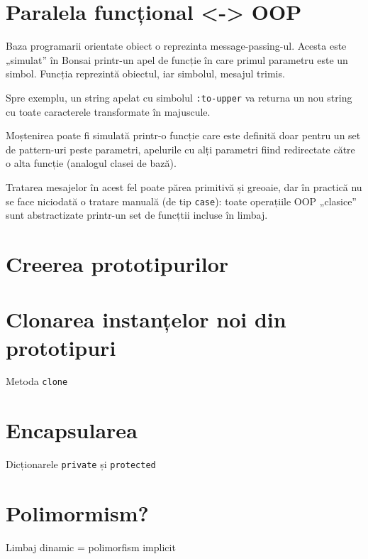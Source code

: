 \documentclass[12pt,a4paper]{memoir}
\begin{document}
\section{Paralela funcțional <-> OOP}

Baza programarii orientate obiect o reprezinta message-passing-ul. Acesta este „simulat” în Bonsai printr-un apel de funcție în care primul parametru este un simbol. Funcția reprezintă obiectul, iar simbolul, mesajul trimis. 

Spre exemplu, un string apelat cu simbolul \texttt{:to-upper} va returna un nou string cu toate caracterele transformate în majuscule. 

Moștenirea poate fi simulată printr-o funcție care este definită doar pentru un set de pattern-uri peste parametri, apelurile cu alți parametri fiind redirectate către o alta funcție (analogul clasei de bază).

Tratarea mesajelor în acest fel poate părea primitivă și greoaie, dar în practică nu se face niciodată o tratare manuală (de tip \texttt{case}): toate operațiile OOP „clasice” sunt abstractizate printr-un set de funcțtii incluse în limbaj.

\section{Creerea prototipurilor}

\section{Clonarea instanțelor noi din prototipuri}

Metoda \texttt{clone}

\section{Encapsularea}

Dicționarele \texttt{private} și \texttt{protected}

\section{Polimormism?}

Limbaj dinamic = polimorfism implicit
\end{document}
